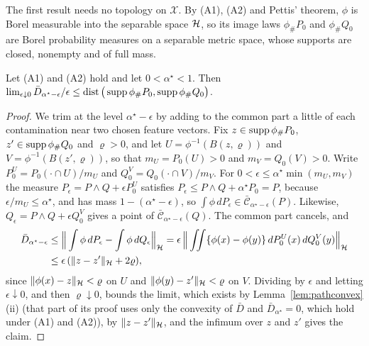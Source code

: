 The first result needs no topology on $\mathcal X$. By (A1), (A2) and Pettis' theorem, $\phi$ is Borel measurable
into the separable space $\mathcal{H}$, so its image laws $\phi_\#P_0$ and $\phi_\#Q_0$ are Borel probability measures on a
separable metric space, whose supports are closed, nonempty and of full mass.

\begin{proposition}
\label{prop:newslopegeneral}
Let (A1) and (A2) hold and let $0<\alpha^\star<1$. Then
$\lim_{\epsilon\downarrow0}\bar D_{\alpha^\star-\epsilon}/\epsilon\le\operatorname{dist}\big(\operatorname{supp}\phi_\#P_0,\operatorname{supp}\phi_\#Q_0\big)$.
\end{proposition}

\begin{proof}
We trim at the level $\alpha^\star-\epsilon$ by adding to the common part a little of each contamination near two
chosen feature vectors. Fix $z\in\operatorname{supp}\phi_\#P_0$, $z'\in\operatorname{supp}\phi_\#Q_0$ and $\varrho>0$, and let
$U=\phi^{-1}(B(z,\varrho))$ and $V=\phi^{-1}(B(z',\varrho))$, so that $m_U=P_0(U)>0$ and $m_V=Q_0(V)>0$. Write
$P_0^U=P_0(\cdot\cap U)/m_U$ and $Q_0^V=Q_0(\cdot\cap V)/m_V$. For $0<\epsilon\le\alpha^\star\min(m_U,m_V)$ the measure
$P_\epsilon=P\wedge Q+\epsilon P_0^U$ satisfies $P_\epsilon\le P\wedge Q+\alpha^\star P_0=P$, because $\epsilon/m_U\le\alpha^\star$, and has
mass $1-(\alpha^\star-\epsilon)$, so $\int\phi\,dP_\epsilon\in \bar{\mathcal C}_{\alpha^\star-\epsilon}(P)$. Likewise,
$Q_\epsilon=P\wedge Q+\epsilon Q_0^V$ gives a point of $\bar{\mathcal C}_{\alpha^\star-\epsilon}(Q)$. The common part cancels, and
\begin{align*}
\bar D_{\alpha^\star-\epsilon}&\le\Big\|\int\phi\,dP_\epsilon-\int\phi\,dQ_\epsilon\Big\|_{\mathcal{H}}
=\epsilon\,\Big\|\iint\{\phi(x)-\phi(y)\}\,dP_0^U(x)\,dQ_0^V(y)\Big\|_{\mathcal{H}}\\
&\le\epsilon\,(\|z-z'\|_{\mathcal{H}}+2\varrho),
\end{align*}
since $\|\phi(x)-z\|_{\mathcal{H}}<\varrho$ on $U$ and $\|\phi(y)-z'\|_{\mathcal{H}}<\varrho$ on $V$. Dividing by $\epsilon$ and letting
$\epsilon\downarrow0$, and then $\varrho\downarrow0$, bounds the limit, which exists by Lemma~\ref{lem:pathconvex}(ii) (that part
of its proof uses only the convexity of $\bar D$ and $\bar D_{\alpha^\star}=0$, which hold under (A1) and (A2)), by $\|z-z'\|_{\mathcal{H}}$, and the infimum over $z$ and $z'$ gives the claim.
\end{proof}

